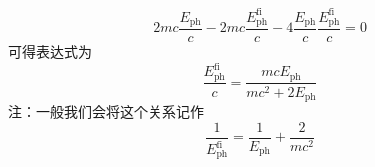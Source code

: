 \begin{solution}
\begin{equation}
        2mc\dfrac{E_{\mathrm{ph}}}{c}-2mc\dfrac{E_{\mathrm{ph}}^{\mathrm{fi}}}{c}-4\dfrac{E_{\mathrm{ph}}}{c}\dfrac{E_{\mathrm{ph}}^{\mathrm{fi}}}{c}=0
    \end{equation}
    可得表达式为
    \begin{equation}
        \dfrac{E_{\mathrm{ph}}^{\mathrm{fi}}}{c}=\dfrac{mcE_{\mathrm{ph}}}{mc^2+2E_{\mathrm{ph}}}
    \end{equation}
    注：一般我们会将这个关系记作
    \begin{equation}
        \dfrac{1}{E_{\mathrm{ph}}^{\mathrm{fi}}}=\dfrac{1}{E_{\mathrm{ph}}}+\dfrac{2}{mc^2}
    \end{equation}
\end{solution}